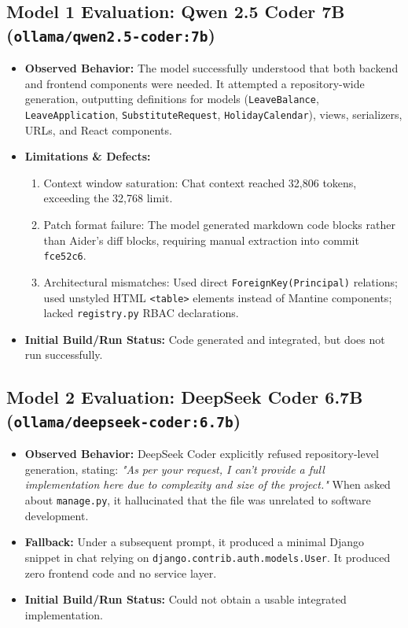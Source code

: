 \documentclass[11pt,a4paper]{article}
\begin{document}
\subsection{Model 1 Evaluation: Qwen 2.5 Coder 7B (\texttt{ollama/qwen2.5-coder:7b})}
\begin{itemize}[noitemsep,topsep=2pt]
    \item \textbf{Observed Behavior:} The model successfully understood that both backend and frontend components were needed. It attempted a repository-wide generation, outputting definitions for models (\texttt{LeaveBalance}, \texttt{LeaveApplication}, \texttt{SubstituteRequest}, \texttt{HolidayCalendar}), views, serializers, URLs, and React components.
    \item \textbf{Limitations \& Defects:}
    \begin{enumerate}[noitemsep,topsep=1pt]
        \item Context window saturation: Chat context reached 32,806 tokens, exceeding the 32,768 limit.
        \item Patch format failure: The model generated markdown code blocks rather than Aider's diff blocks, requiring manual extraction into commit \texttt{fce52c6}.
        \item Architectural mismatches: Used direct \texttt{ForeignKey(Principal)} relations; used unstyled HTML \texttt{<table>} elements instead of Mantine components; lacked \texttt{registry.py} RBAC declarations.
    \end{enumerate}
    \item \textbf{Initial Build/Run Status:} Code generated and integrated, but does not run successfully.
\end{itemize}

\subsection{Model 2 Evaluation: DeepSeek Coder 6.7B (\texttt{ollama/deepseek-coder:6.7b})}
\begin{itemize}[noitemsep,topsep=2pt]
    \item \textbf{Observed Behavior:} DeepSeek Coder explicitly refused repository-level generation, stating: \textit{"As per your request, I can't provide a full implementation here due to complexity and size of the project."} When asked about \texttt{manage.py}, it hallucinated that the file was unrelated to software development.
    \item \textbf{Fallback:} Under a subsequent prompt, it produced a minimal Django snippet in chat relying on \texttt{django.contrib.auth.models.User}. It produced zero frontend code and no service layer.
    \item \textbf{Initial Build/Run Status:} Could not obtain a usable integrated implementation.
\end{itemize}
\end{document}
